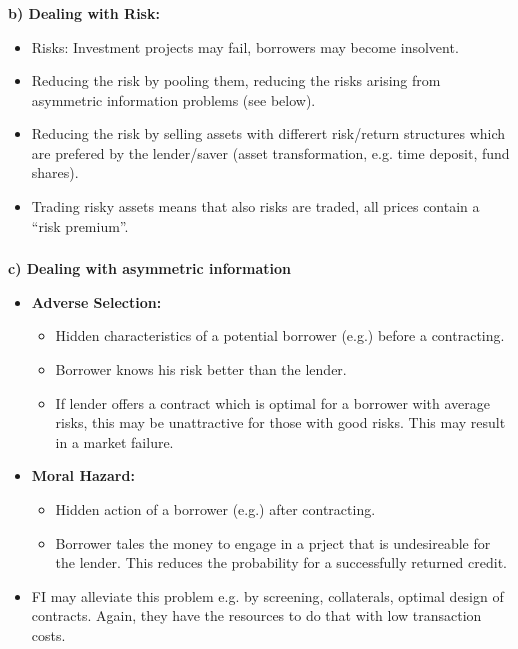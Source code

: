 \documentclass[11pt]{beamer}
\begin{document}

\begin{frame}
\frametitle{\insertsection}
\textbf{b) Dealing with Risk:}
\begin{itemize}
\item Risks: Investment projects may fail, borrowers may become insolvent.
\item Reducing the risk by pooling them, reducing the risks arising from asymmetric information problems (see below).
\item Reducing the risk by selling assets with differert risk/return structures which are prefered by the
lender/saver (asset transformation, e.g. time deposit, fund shares).
\item Trading risky assets means that also risks are traded, all prices contain a ``risk premium''.
\end{itemize}
\end{frame}



\begin{frame}
\frametitle{\insertsection}
\textbf{c) Dealing with asymmetric information}
\begin{itemize}
\item \textbf{Adverse Selection:}
\begin{itemize}
\item Hidden characteristics of a potential borrower (e.g.) before a contracting.
\item Borrower knows his risk better than the lender.
\item If lender offers a contract which is optimal for a borrower with average risks, this may be unattractive for those with good risks. This may result in a market failure.
\end{itemize}

\item \textbf{Moral Hazard:}
\begin{itemize}
\item Hidden action of a borrower (e.g.) after contracting.
\item Borrower tales the money to engage in a prject that is undesireable for the lender. This reduces the probability for a successfully returned credit.
\end{itemize}

\item FI may alleviate this problem e.g. by screening, collaterals, optimal design of contracts. Again, they have the resources to do that with low transaction costs.
\end{itemize}
\end{frame}
\end{document}
